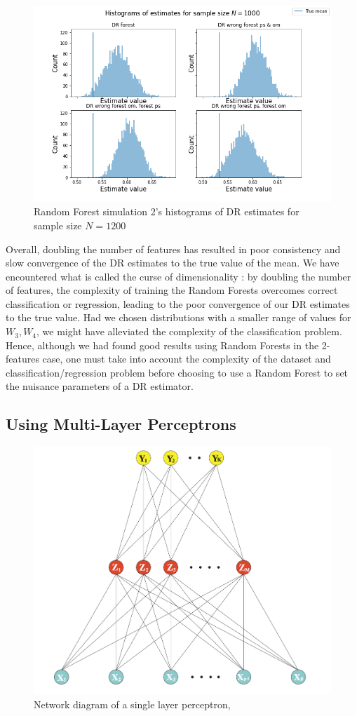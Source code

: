 \documentclass[12pt,twoside]{article}
\begin{document}
\begin{figure}[h!]
    \centering
    \includegraphics[width = 0.9\columnwidth]{figures/histRF_moreW.png}
    \caption{Random Forest simulation 2's histograms of DR estimates for sample size $N = 1200$}
    \label{fighistRF_moreW}
\end{figure}

Overall, doubling the number of features has resulted in poor consistency and slow convergence of the DR estimates to the true value of the mean. We have encountered what is called the curse of dimensionality \citep{Wasserman2006}: by doubling the number of features, the complexity of training the Random Forests overcomes correct classification or regression, leading to the poor convergence of our DR estimates to the true value. Had we chosen distributions with a smaller range of values for $W_3,W_4$, we might have alleviated the complexity of the classification problem. Hence, although we had found good results using Random Forests in the 2-features case, one must take into account the complexity of the dataset and classification/regression problem before choosing to use a Random Forest to set the nuisance parameters of a DR estimator.

\clearpage
\subsection{Using Multi-Layer Perceptrons}
\begin{figure}[h!]
    \centering
    \includegraphics[width = 0.7\columnwidth]{figures/Screenshot 2021-05-26 at 19.21.43.png}
    \caption{Network diagram of a single layer perceptron, \citet{hastieESL}}
    \label{fignn}
\end{figure}
\end{document}

